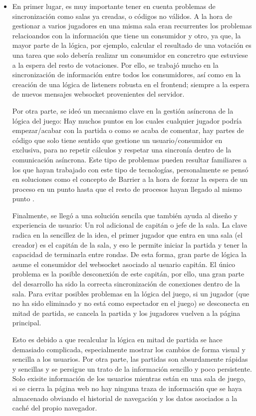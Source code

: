 \begin{itemize}
	\item En primer lugar, es muy importante tener en cuenta problemas de sincronización como salas ya creadas, o códigos no válidos. A la hora de gestionar a varios jugadores en una misma sala
		  eran recurrentes los problemas relacioandos con la información que tiene un consumidor y otro, ya que, la mayor parte de la lógica, por ejemplo, calcular el resultado de una votación
		  es una tarea que solo debería realizar un consumidor en concretro que estuviese a la espera del resto de votaciones. Por ello, se trabajó mucho en la sincronización de información
		  entre todos los consumidores, así como en la creación de una lógica de listeners robusta en el frontend; siempre a la espera de nuevos mensajes websocket provenientes del servidor.
	
		  Por otra parte, se ideó un mecanismo clave en la gestión asíncrona de la lógica del juego: Hay muchos puntos en los cuales cualquier jugador podría empezar/acabar con la partida
		  o como se acaba de comentar, hay partes de código que solo tiene sentido que gestione un usuario/consumidor en exclusiva, para no repetir cálculos y respetar una sincronía dentro
		  de la comunicación asíncrona. Este tipo de problemas pueden resultar familiares a los que hayan trabajado con este tipo de tecnologías, personalmente se pensó en soluciones como el concepto de Barrier
		  a la hora de forzar la espera de un proceso en un punto hasta que el resto de procesos hayan llegado al mismo punto \cite{Barrier}. 
		
		  Finalmente, se llegó a una solución sencila que también ayuda al diseño y experiencia de usuario: Un rol adicional de capitán o jefe de la sala. La clave radica en la sencillez de la idea, 
		  el primer jugador que entra en una sala (el creador) es el capitán de la sala, y eso le permite iniciar la partida y tener la capacidad de terminarla entre rondas. De esta forma, gran parte de lógica la asume el 
		  consumidor del websocket asociado al usuario capitán. El único problema es la posible desconexión de este capitán, por ello, una gran parte del desarrollo ha sido la correcta sincronización de conexiones dentro 
		  de la sala. Para evitar posibles problemas en la lógica del juego, si un jugador (que no ha sido eliminado y no está como espectador en el juego) se desconecta en mitad de partida, se cancela la partida 
		  y los jugadores vuelven a la página principal.
		
		  Esto es debido a que recalcular la lógica en mitad de partida se hace demasiado complicada, especialmente mostrar los cambios de forma visual y sencilla a los usuarios. Por otra parte, las partidas son
		  absurdamente rápidas y sencillas y se persigue un trato de la información sencillo y poco persistente. Solo exisite información de los usuarios mientras están en una sala de juego, si se cierra la página 
		  web no hay ninguna traza de información que se haya almacenado obviando el historial de navegación y los datos asociados a la caché del propio navegador.


\end{itemize}
